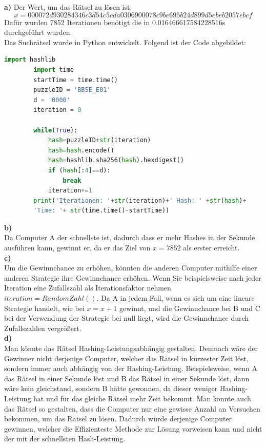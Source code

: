 \documentclass[german]{../uebung}
\begin{document}
\begin{exercise}{4}\textbf{a)}
    Der Wert, um das Rätsel zu lösen ist: \[x=000072d930284346c3d54c5cda0306900078c9be695b24d899d5ebeb2057ebcf\] Dafür wurden 7852 Iterationen benötigt die in 0.016466617584228516s durchgeführt wurden.\\
    Das Suchrätsel wurde in Python entwickelt. Folgend ist der Code abgebildet:
    \begin{lstlisting}[language=Python]
        import hashlib 
        import time 
        startTime = time.time() 
        puzzleID = 'BBSE_E01' 
        d = '0000'
        iteration = 0
        
        while(True):
            hash=puzzleID+str(iteration)
            hash=hash.encode()
            hash=hashlib.sha256(hash).hexdigest()
            if (hash[:4]==d):
                break
            iteration+=1
        print('Iterationen: '+str(iteration)+' Hash: ' +str(hash)+
        'Time: '+ str(time.time()-startTime))
    \end{lstlisting}
    \textbf{b)}\\
    Da Computer A der schnellste ist, dadurch dass er mehr Hashes in der Sekunde ausführen kann, gewinnt er, da er das Ziel von \(x=7852\) als erster erreicht.\\
    \textbf{c)}\\
    Um die Gewinnchance zu erhöhen, könnten die anderen Computer mithilfe einer anderen Strategie ihre Gewinnchance erhöhen. Wenn Sie beispielsweise nach jeder Iteration eine Zufallszahl als Iterationsfaktor nehmen \(iteration=RandomZahl()\). Da A in jedem Fall, wenn es sich um eine lineare Strategie handelt, wie bei \(x=x+1\) gewinnt, und die Gewinnchance bei B und C bei der Verwendung der Strategie bei null liegt, wird die Gewinnchance durch Zufallszahlen vergrößert. \\
    \textbf{d)}\\
    Man könnte das Rätsel Hashing-Leistungsabhängig gestalten. Demnach wäre der Gewinner nicht derjenige Computer, welcher das Rätsel in kürzester Zeit löst, sondern immer auch abhängig von der Hashing-Leistung. Beispielsweise, wenn A das Rätsel in einer Sekunde löst und B das Rätsel in einer Sekunde löst, dann wäre kein gleichstand, sondern B hätte gewonnen, da dieser weniger Hashing-Leistung hat und für das gleiche Rätsel mehr Zeit bekommt.
    Man könnte auch das Rätsel so gestalten, dass die Computer nur eine gewisse Anzahl an Versuchen bekommen, um das Rätsel zu lösen. Dadurch würde derjenige Computer gewinnen, welcher die Effizienteste Methode zur Lösung vorweisen kann und nicht der mit der schnellsten Hash-Leistung.\\
\end{exercise}\\
\end{document}
